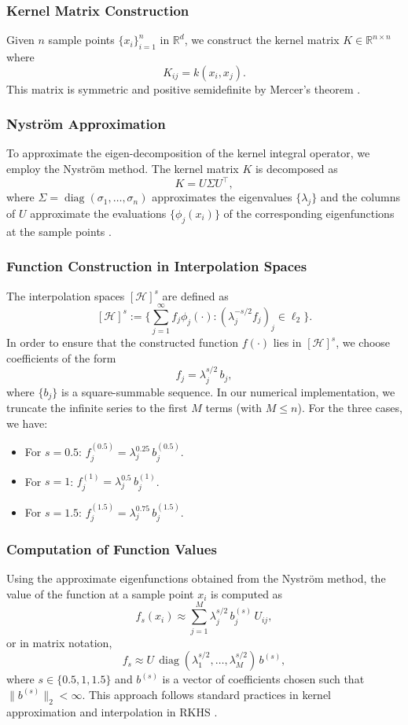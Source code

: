 \documentclass{article}
\theoremstyle{plain}
\theoremstyle{definition}
\theoremstyle{remark}
\begin{document}
\subsubsection{Kernel Matrix Construction}
Given $n$ sample points $\{x_i\}_{i=1}^{n}$ in $\mathbb{R}^d$, we construct the kernel matrix $K \in \mathbb{R}^{n \times n}$ where
\[
K_{ij}=k(x_i,x_j).
\]
This matrix is symmetric and positive semidefinite by Mercer’s theorem \cite{Mercer1909}.

\subsubsection{Nyström Approximation}
To approximate the eigen-decomposition of the kernel integral operator, we employ the Nyström method. The kernel matrix $K$ is decomposed as
\[
K = U \Sigma U^\top,
\]
where $\Sigma = \operatorname{diag}(\sigma_1,\dots,\sigma_n)$ approximates the eigenvalues $\{\lambda_j\}$ and the columns of $U$ approximate the evaluations $\{\phi_j(x_i)\}$ of the corresponding eigenfunctions at the sample points \cite{Williams2001}.

\subsubsection{Function Construction in Interpolation Spaces}
The interpolation spaces $[\mathcal{H}]^s$ are defined as
\[
[\mathcal{H}]^s := \Big\{ \sum_{j=1}^{\infty} f_j \phi_{j}(\cdot): \left(\lambda_j^{-s / 2} f_j\right)_{j} \in \ell_2 \Big\}.
\]
In order to ensure that the constructed function $f(\cdot)$ lies in $[\mathcal{H}]^s$, we choose coefficients of the form
\[
f_j = \lambda_j^{s/2}\, b_j,
\]
where $\{b_j\}$ is a square-summable sequence. In our numerical implementation, we truncate the infinite series to the first $M$ terms (with $M \le n$). For the three cases, we have:
\begin{itemize}
    \item For $s=0.5$: $f_j^{(0.5)} = \lambda_j^{0.25}\, b_j^{(0.5)}$.
    \item For $s=1$: $f_j^{(1)} = \lambda_j^{0.5}\, b_j^{(1)}$.
    \item For $s=1.5$: $f_j^{(1.5)} = \lambda_j^{0.75}\, b_j^{(1.5)}$.
\end{itemize}

\subsubsection{Computation of Function Values}
Using the approximate eigenfunctions obtained from the Nyström method, the value of the function at a sample point $x_i$ is computed as
\[
f_s(x_i) \approx \sum_{j=1}^{M} \lambda_j^{s/2}\, b_j^{(s)}\, U_{ij},
\]
or in matrix notation,
\[
f_s \approx U \, \operatorname{diag}\left(\lambda_1^{s/2}, \dots, \lambda_M^{s/2}\right) \, b^{(s)},
\]
where $s \in \{0.5,1,1.5\}$ and $b^{(s)}$ is a vector of coefficients chosen such that $\|b^{(s)}\|_2 < \infty$. This approach follows standard practices in kernel approximation and interpolation in RKHS \cite{Rasmussen2006,Scholkopf2002,Cucker2007}.
\end{document}
